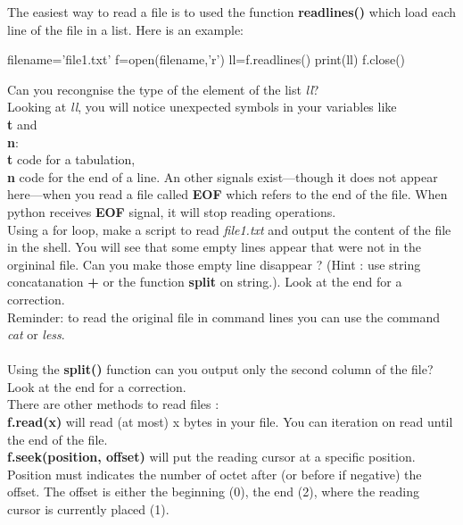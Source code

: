 \documentclass[article,10pt]{scrartcl}
\begin{document}
The easiest way to read a file is to used the function \textbf{readlines()} which load each line of the file in a list. Here is an example:
\\
\begin{python}
filename='file1.txt'
f=open(filename,'r')
ll=f.readlines()
print(ll)
f.close()
\end{python}
Can you recongnise the type of the element of the list \textit{ll}? \\
Looking at \textit{ll}, you will notice unexpected symbols in your variables like \textbf{\\t} and \textbf{\\n}:
 \textbf{\\t} code for a tabulation, \textbf{\\n} code for the end of a line. An other signals exist---though it does not appear here---when you read a file called \textbf{EOF} which refers to the end of the file. When python receives \textbf{EOF} signal, it will stop reading operations.
\\
Using a for loop, make a script to read \textit{file1.txt} and output the content of the file in the shell. You will see that some empty lines appear that were not in the orgininal file. Can you make those empty line disappear ? (Hint : use string concatanation \textbf{+} or the function \textbf{split} on string.). Look at the end for a correction.
\\
Reminder: to read the original file in command lines you can use the command \textit{cat} or \textit{less}.
\\\\
Using the \textbf{split()} function can you output only the second column of the file? Look at the end for a correction.
\\
There are other methods to read files :\\
\textbf{f.read(x)} will read (at most) x bytes in your file. You can iteration on read until the end of the file.\\
\textbf{f.seek(position, offset)} will put the reading cursor at a specific position. Position must indicates the number of octet after (or before if negative) the offset. The offset is either the beginning (0), the end (2), where the reading cursor is currently placed (1).
\end{document}
